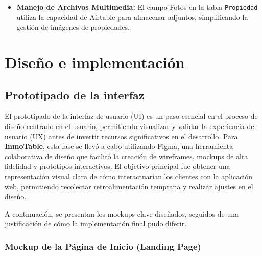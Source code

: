 \begin{enumerate}
\begin{itemize}
        \item \textbf{Manejo de Archivos Multimedia:} El campo Fotos en la tabla \texttt{Propiedad} utiliza la capacidad de Airtable para almacenar adjuntos, simplificando la gestión de imágenes de propiedades.
    \end{itemize}

\end{enumerate}


\section{Diseño e implementación}


\subsection{Prototipado de la interfaz}


El prototipado de la interfaz de usuario (UI) es un paso esencial en el proceso de diseño centrado en el usuario, permitiendo visualizar y validar la experiencia del usuario (UX) antes de invertir recursos significativos en el desarrollo. Para \textbf{InmoTable}, esta fase se llevó a cabo utilizando Figma, una herramienta colaborativa de diseño que facilitó la creación de wireframes, mockups de alta fidelidad y prototipos interactivos. El objetivo principal fue obtener una representación visual clara de cómo interactuarían los clientes con la aplicación web, permitiendo recolectar retroalimentación temprana y realizar ajustes en el diseño.

A continuación, se presentan los mockups clave diseñados, seguidos de una justificación de cómo la implementación final pudo diferir.

\subsubsection{Mockup de la Página de Inicio (Landing Page)}

